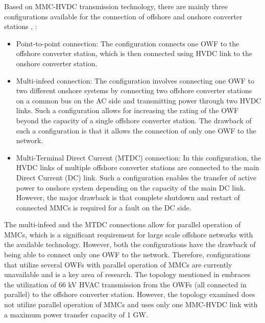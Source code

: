 Based on \gls{MMC}-\gls{HVDC} transmission technology, there are mainly three configurations available for the connection of offshore and onshore converter stations \cite{cigre_B455}, \cite{sharifabadi2016design}: 
\begin{itemize}
    \item Point-to-point connection: The configuration connects one \gls{OWF} to the offshore converter station, which is then connected using \gls{HVDC} link to the onshore converter station.
    \item Multi-infeed connection: The configuration involves connecting one \gls{OWF} to two different onshore systems by connecting two offshore converter stations on a common bus on the \gls{AC} side and transmitting power through two \gls{HVDC} links. Such a configuration allows for increasing the rating of the \gls{OWF} beyond the capacity of a single offshore converter station. The drawback of such a configuration is that it allows the connection of only one \gls{OWF} to the network.
    \item Multi-Terminal Direct
    Current (MTDC) connection: In this configuration, the \gls{HVDC} links of multiple offshore converter stations are connected to the main Direct Current (\gls{DC}) link. Such a configuration enables the transfer of active power to onshore system depending on the capacity of the main \gls{DC} link. However, the major drawback is that complete shutdown and restart of connected \gls{MMC}s is required for a fault on the \gls{DC} side.
\end{itemize}

The multi-infeed and the MTDC connections allow for parallel operation of \gls{MMC}s, which is a significant requirement for large scale offshore networks with the available technology. However, both the configurations have the drawback of being able to connect only one \gls{OWF} to the network. Therefore, configurations that utilize several \gls{OWF}s with parallel operation of \gls{MMC}s are currently unavailable and is a key area of research. The topology mentioned in \cite{lozada_ayala_dynamic_2018} embraces the utilization of 66 kV \gls{HVAC} transmission from the \gls{OWF}s (all connected in parallel) to the offshore converter station. However, the topology examined does not utilize parallel operation of \gls{MMC}s and uses only one \gls{MMC}-\gls{HVDC} link with a maximum power transfer capacity of 1 GW.


